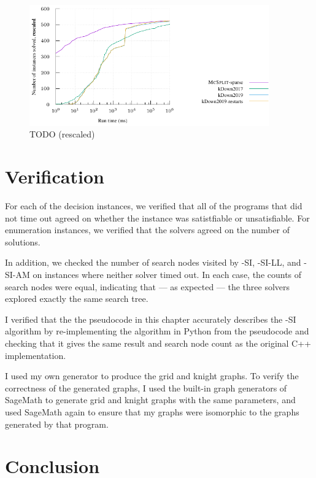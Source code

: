 \begin{figure}[htb]
    \centering
    \includegraphics*[width=0.92\textwidth]{14b-mcsplit-induced-si/sip-instances-mcis-experiment/experiment/plots/cumulative-rescaled.pdf}
    \caption{TODO (rescaled)}
    \label{figure:mcsplit-sparse-cumulative-rescaled}
\end{figure}

\section{Verification}

For each of the decision instances, we verified that all of the programs that did not time out
agreed on whether the instance was satistfiable or unsatisfiable.  For enumeration instances,
we verified that the solvers agreed on the number of solutions.

In addition, we checked the number of search nodes visited by \McSplit-SI,
\McSplit-SI-LL, and \McSplit-SI-AM
on instances where neither solver timed out.  In each case, the counts of search nodes were equal,
indicating that --- as expected --- the three solvers explored exactly the same search tree.

I verified that the the pseudocode in this chapter accurately describes the \McSplit-SI
algorithm by re-implementing the algorithm in Python from the pseudocode and checking
that it gives the same result and search node count as the original C++ implementation.

I used my own generator to produce the grid and knight graphs.  To verify the
correctness of the generated graphs, I used the built-in graph generators of
SageMath \citep{sagemath} to generate grid and knight graphs with the same
parameters, and used SageMath again to ensure that my graphs were isomorphic to
the graphs generated by that program.

\section{Conclusion}

